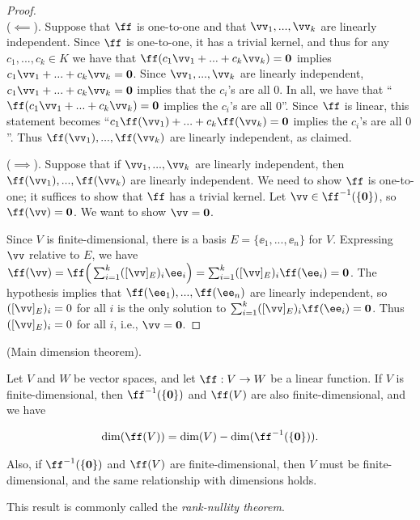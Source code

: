\begin{proof}
    \mbox{} \\
    \indent ($\impliedby$). Suppose that $\ff$ is one-to-one and that $\vv_1, ..., \vv_k$ are linearly independent. Since $\ff$ is one-to-one, it has a trivial kernel, and thus for any $c_1, ..., c_k \in K$ we have that $\ff(c_1 \vv_1 + ... + c_k \vv_k) = \mathbf{0}$ implies $c_1 \vv_1 + ... + c_k \vv_k = \mathbf{0}$. Since $\vv_1, ..., \vv_k$ are linearly independent, $c_1 \vv_1 + ... + c_k \vv_k = \mathbf{0}$ implies that the $c_i$'s are all $0$. In all, we have that ``$\ff(c_1 \vv_1 + ... + c_k \vv_k) = \mathbf{0}$ implies the $c_i$'s are all $0$''. Since $\ff$ is linear, this statement becomes  ``$c_1 \ff(\vv_1) + ... + c_k \ff(\vv_k) = \mathbf{0}$ implies the $c_i$'s are all $0$''. Thus $\ff(\vv_1), ..., \ff(\vv_k)$ are linearly independent, as claimed.
    
    ($\implies$). Suppose that if $\vv_1, ..., \vv_k$ are linearly independent, then $\ff(\vv_1), ..., \ff(\vv_k)$ are linearly independent. We need to show $\ff$ is one-to-one; it suffices to show that $\ff$ has a trivial kernel. Let $\vv \in \ff^{-1}(\{\mathbf{0}\})$, so $\ff(\vv) = \mathbf{0}$. We want to show $\vv = \mathbf{0}$. 
    
    Since $V$ is finite-dimensional, there is a basis $E = \{\ee_1, ..., \ee_n\}$ for $V$. Expressing $\vv$ relative to $E$, we have $\ff(\vv) = \ff\Big(\sum_{i = 1}^k ([\vv]_E)_i \ee_i\Big) = \sum_{i = 1}^k ([\vv]_E)_i \ff(\ee_i) = \mathbf{0}$. The hypothesis implies that $\ff(\ee_1), ..., \ff(\ee_n)$ are linearly independent, so $([\vv]_E)_i = 0$ for all $i$ is the only solution to $\sum_{i = 1}^k ([\vv]_E)_i \ff(\ee_i) = \mathbf{0}$. Thus $([\vv]_E)_i = 0$ for all $i$, i.e., $\vv = \mathbf{0}$.
\end{proof}

\begin{theorem}
\label{ch::lin_alg::thm::main_dim}
    (Main dimension theorem).
    
    Let $V$ and $W$ be vector spaces, and let $\ff:V \rightarrow W$ be a linear function. If $V$ is finite-dimensional, then $\ff^{-1}(\{\mathbf{0}\})$ and $\ff(V)$ are also finite-dimensional, and we have

    \begin{align*}
        \dim(\ff(V)) = \dim(V) - \dim(\ff^{-1}(\{\mathbf{0}\})).
    \end{align*}
    
    Also, if $\ff^{-1}(\{\mathbf{0}\})$ and $\ff(V)$ are finite-dimensional, then $V$ must be finite-dimensional, and the same relationship with dimensions holds.
    
    This result is commonly called the \textit{rank-nullity theorem}.
\end{theorem}

